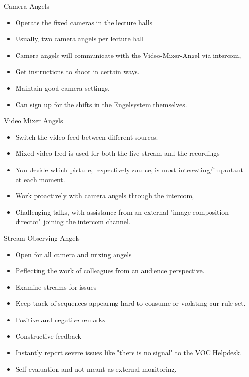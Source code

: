 \documentclass[aspectratio=169]{beamer}
\begin{document}
\begin{frame}{Camera Angels}
	\begin{itemize}
		\item Operate the fixed cameras in the lecture halls. 
		\item Usually, two camera angels per lecture hall 
		\item Camera angels will communicate with the Video-Mixer-Angel via intercom,
		\item Get instructions to shoot in certain ways. 
		\item Maintain good camera settings.
		\item Can sign up for the shifts in the Engelsystem themselves.
	\end{itemize}
\end{frame}

\begin{frame}{Video Mixer Angels}
	\begin{itemize}
		\item Switch the video feed between different sources. 
		\item Mixed video feed is used for both the live-stream and the recordings 
		\item You decide which picture, respectively source, is most interesting/important at each moment.
		\item Work proactively with camera angels through the intercom, 
		\item Challenging talks, with assistance from an external "image composition director" joining the intercom channel.
	\end{itemize}
\end{frame}

\begin{frame}{Stream Observing Angels}
	\begin{itemize}
		\item Open for all camera and mixing angels
		\item Reflecting the work of colleagues from an audience perspective.
		\item Examine streams for issues 
		\item Keep track of sequences appearing hard to consume or violating our rule set. 
		\item Positive and negative remarks 
		\item Constructive feedback 
		\item Instantly report severe issues like "there is no signal" to the VOC Helpdesk.%
		\item Self evaluation and not meant as external monitoring. 
	\end{itemize}
\end{frame}
\end{document}
